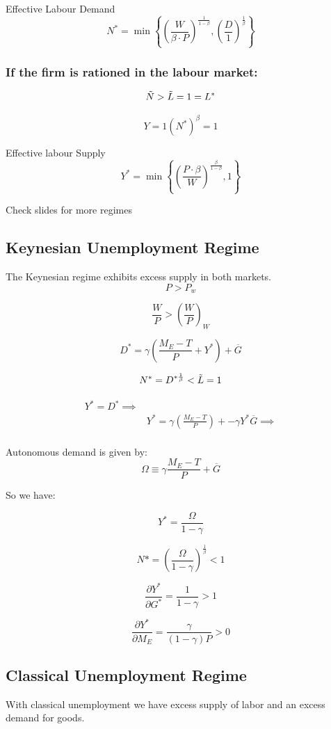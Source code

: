 Effective Labour Demand
$$
N^* = \min \left\{ \left( \frac { W } { \beta \cdot P } \right) ^ { \frac { 1 } { 1 - \beta } },  \left( \frac{D}{1} \right)^{\frac{1}{\beta}}   \right\}
$$

\subsubsection*{If the firm is rationed in the labour market: }

$$
\Tilde{N} > \Tilde{L} = 1 = L^*
$$


$$
Y = 1(N^*)^\beta = 1
$$

Effective labour Supply
$$
Y^* = \min \left\{ \left( \frac { P \cdot \beta} { W } \right) ^ { \frac { \beta } { 1 - \beta } }, 1   \right\}
$$

Check slides for more regimes

\subsection*{Keynesian Unemployment Regime}
The Keynesian regime exhibits excess supply in both markets.
$$
P > P_w
$$

$$
\frac{W}{P} > \left( \frac{W}{P} \right)_W
$$

$$
D^* = \gamma \left( \frac{M_E - T}{P} + Y^* \right) + \overline{G}
$$

$$
N^* = D^{* \frac{1}{\beta}} < \Tilde{L} = 1
$$

\begin{align}
    Y^* = D^* \implies \\
    &  Y^* = \gamma \left( \frac{M_E - T}{P}  \right) + -  \gamma Y^* \overline{G} \implies \\
\end{align}

Autonomous demand is given by:
$$
\Omega \equiv \gamma \frac{M_E - T}{P} + \overline{G}
$$

So we have: 

$$
Y^* = \frac{\Omega}{1 - \gamma}
$$

$$
N* = \left( \frac{\Omega}{1 - \gamma}  \right)^{\frac{1}{\beta}} < 1
$$

$$
\frac{\partial Y^*}{\partial G^*} = \frac{1}{1 - \gamma} > 1
$$

$$
\frac{\partial Y^*}{\partial M_E} = \frac{\gamma}{(1 - \gamma) P} > 0
$$

\clearpage

\subsection*{Classical Unemployment Regime}
With classical unemployment we have excess supply of labor and an excess demand for goods. 

